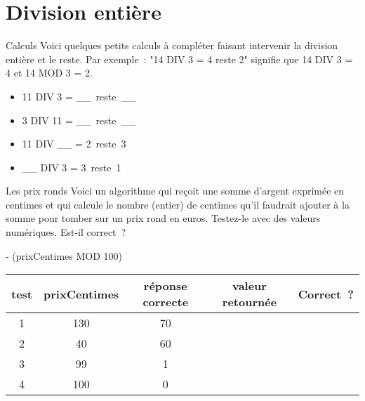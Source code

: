 			\section{Division entière}
			
			\begin{Exercice}{Calculs}
				Voici quelques petits calculs à compléter
				faisant intervenir la division entière et le reste.
				Par exemple~: "14 DIV 3 = 4 reste 2"
				signifie que 14 DIV 3 = 4 et 14 MOD 3 = 2.
				
				\begin{multicols}{2}
					\begin{itemize}
					\item 11 DIV 3 = \_\_\ reste\ \_\_
					\item 3 DIV 11 = \_\_\ reste\ \_\_
					\item 11 DIV \_\_ = 2\ reste\ 3
					\item \_\_ DIV 3 = 3\ reste\ 1
					\end{itemize}
				\end{multicols}
			\end{Exercice}

			\begin{Exercice}{Les prix ronds}
				Voici un algorithme qui reçoit une somme d’argent exprimée en centimes
				et qui calcule le nombre (entier) de centimes qu’il
				faudrait ajouter à la somme pour tomber sur un prix rond en euros.
				Testez-le avec des valeurs numériques. Est-il correct~?
				
				\begin{pseudocode}
					 - (prixCentimes MOD 100)
				\EndAlgo
				\end{pseudocode}
				
				\begin{center}
				\begin{tabular}{|c|c|c|c|c|}
				\hline
				test \no & prixCentimes & réponse correcte & valeur retournée & Correct~? \\\hline
				\hline 
				1 & 130 & 70 &  & \\\hline
				2 & 40  & 60 &  & \\\hline
				3 & 99  & 1  &  & \\\hline
				4 & 100 & 0  &  & \\\hline
				\end{tabular}
				\end{center}
				
			\end{Exercice}
			
